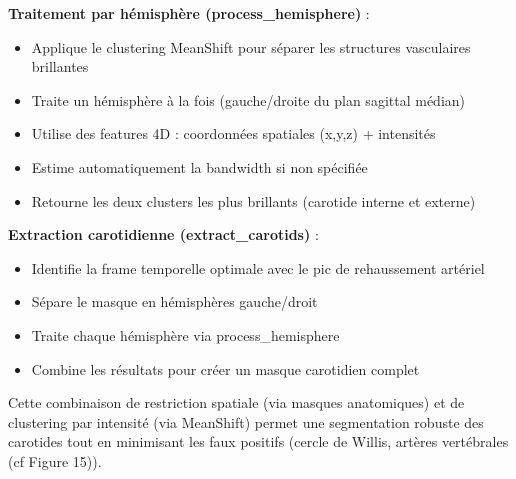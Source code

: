 \documentclass[a4paper]{article}
\begin{document}
                \textbf{Traitement par hémisphère (process\_hemisphere)} :
                \begin{itemize}
                    \item Applique le clustering MeanShift pour séparer les structures vasculaires brillantes
                    \item Traite un hémisphère à la fois (gauche/droite du plan sagittal médian)
                    \item Utilise des features 4D : coordonnées spatiales (x,y,z) + intensités
                    \item Estime automatiquement la bandwidth si non spécifiée
                    \item Retourne les deux clusters les plus brillants (carotide interne et externe)
                \end{itemize}
                
                \vspace{1em} 
                \hspace{0em}\textbf{Extraction carotidienne (extract\_carotids)} :
                \begin{itemize}
                    \item Identifie la frame temporelle optimale avec le pic de rehaussement artériel
                    \item Sépare le masque en hémisphères gauche/droit
                    \item Traite chaque hémisphère via process\_hemisphere
                    \item Combine les résultats pour créer un masque carotidien complet
                \end{itemize}

            Cette combinaison de restriction spatiale (via masques anatomiques) et de clustering par intensité (via MeanShift) permet une segmentation robuste des carotides tout en minimisant les faux positifs (cercle de Willis, artères vertébrales (cf Figure 15)).\\
            
        \noindent
\end{document}
